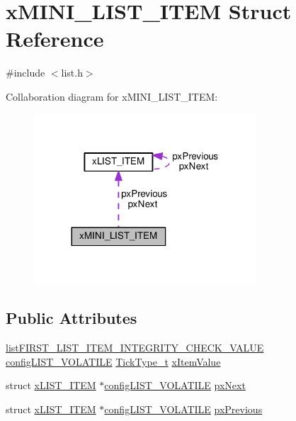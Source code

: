 \hypertarget{structx_m_i_n_i___l_i_s_t___i_t_e_m}{}\section{x\+M\+I\+N\+I\+\_\+\+L\+I\+S\+T\+\_\+\+I\+T\+EM Struct Reference}
\label{structx_m_i_n_i___l_i_s_t___i_t_e_m}


{\ttfamily \#include $<$list.\+h$>$}



Collaboration diagram for x\+M\+I\+N\+I\+\_\+\+L\+I\+S\+T\+\_\+\+I\+T\+EM\+:\nopagebreak
\begin{figure}[H]
\begin{center}
\leavevmode
\includegraphics[width=236pt]{structx_m_i_n_i___l_i_s_t___i_t_e_m__coll__graph}
\end{center}
\end{figure}
\subsection*{Public Attributes}
\begin{DoxyCompactItemize}
\item 
\hyperlink{list_8h_a3611bd5d5d87cb26ac1dc7a4852b94a0}{list\+F\+I\+R\+S\+T\+\_\+\+L\+I\+S\+T\+\_\+\+I\+T\+E\+M\+\_\+\+I\+N\+T\+E\+G\+R\+I\+T\+Y\+\_\+\+C\+H\+E\+C\+K\+\_\+\+V\+A\+L\+UE} \hyperlink{list_8h_a2d5de557c5561c8980d1bf51d87d8cba}{config\+L\+I\+S\+T\+\_\+\+V\+O\+L\+A\+T\+I\+LE} \hyperlink{portmacro_8h_aa69c48c6e902ce54f70886e6573c92a9}{Tick\+Type\+\_\+t} \hyperlink{structx_m_i_n_i___l_i_s_t___i_t_e_m_aae79c54ac1efa30959e68604cc23b29e}{x\+Item\+Value}
\item 
struct \hyperlink{structx_l_i_s_t___i_t_e_m}{x\+L\+I\+S\+T\+\_\+\+I\+T\+EM} $\ast$\hyperlink{list_8h_a2d5de557c5561c8980d1bf51d87d8cba}{config\+L\+I\+S\+T\+\_\+\+V\+O\+L\+A\+T\+I\+LE} \hyperlink{structx_m_i_n_i___l_i_s_t___i_t_e_m_aa7ae770b0f10daeb9ac76c6f7dd5608e}{px\+Next}
\item 
struct \hyperlink{structx_l_i_s_t___i_t_e_m}{x\+L\+I\+S\+T\+\_\+\+I\+T\+EM} $\ast$\hyperlink{list_8h_a2d5de557c5561c8980d1bf51d87d8cba}{config\+L\+I\+S\+T\+\_\+\+V\+O\+L\+A\+T\+I\+LE} \hyperlink{structx_m_i_n_i___l_i_s_t___i_t_e_m_a732c666bb97560eb1b094a2c411269ab}{px\+Previous}
\end{DoxyCompactItemize}


